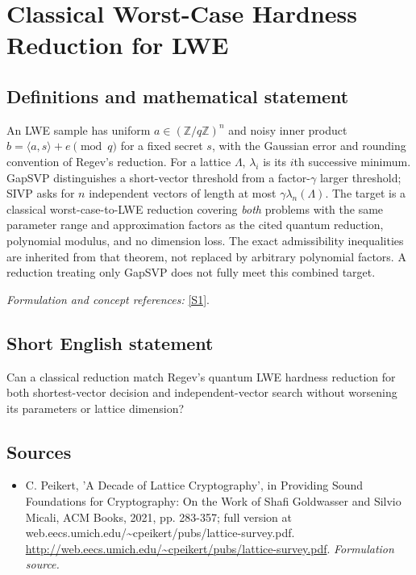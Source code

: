 \documentclass[11pt]{article}
\begin{document}
\section*{\texorpdfstring{Classical Worst-Case Hardness Reduction for LWE}{Classical Worst-Case Hardness Reduction for LWE}}\label{30006822}
\subsection{Definitions and mathematical statement}
An LWE sample has uniform $a\in({\mathbb{Z}}/q{\mathbb{Z}})^n$ and noisy inner product
$b=\langle a,s\rangle+e\pmod q$ for a fixed secret $s$, with the Gaussian error and rounding convention of Regev's reduction. For a lattice $\Lambda$, $\lambda_i$ is its $i$th successive minimum. GapSVP distinguishes a short-vector threshold from a factor-$\gamma$ larger threshold; SIVP asks for $n$ independent vectors of length at most $\gamma\lambda_n(\Lambda)$. The target is a classical worst-case-to-LWE reduction covering \emph{both} problems with the same parameter range and approximation factors as the cited quantum reduction, polynomial modulus, and no dimension loss. The exact admissibility inequalities are inherited from that theorem, not replaced by arbitrary polynomial factors. A reduction treating only GapSVP does not fully meet this combined target.
\par\smallskip\textit{Formulation and concept references:} \href{http://web.eecs.umich.edu/~cpeikert/pubs/lattice-survey.pdf}{[S1]}.

\subsection{Short English statement}
Can a classical reduction match Regev's quantum LWE hardness reduction for both shortest-vector decision and independent-vector search without worsening its parameters or lattice dimension?
\subsection{Sources}
\begin{itemize}
\item[S1]C. Peikert, 'A Decade of Lattice Cryptography', in Providing Sound Foundations for Cryptography: On the Work of Shafi Goldwasser and Silvio Micali, ACM Books, 2021, pp. 283-357; full version at web.eecs.umich.edu/\textasciitilde{}cpeikert/pubs/lattice-survey.pdf.
\url{http://web.eecs.umich.edu/~cpeikert/pubs/lattice-survey.pdf}.
\textit{Formulation source.}
\end{itemize}
\end{document}
